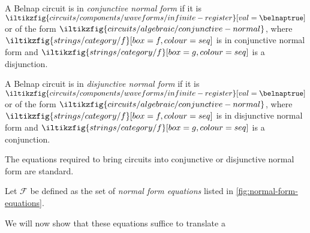 \begin{definition}
    A Belnap circuit is in \emph{conjunctive normal form} if it is \(
    \iltikzfig{circuits/components/waveforms/infinite-register}[val=\belnaptrue]
    \) or of the form \(
    \iltikzfig{circuits/algebraic/conjunctive-normal}
    \), where \(
    \iltikzfig{strings/category/f}[box=f, colour=seq]
    \) is in conjunctive normal form and \(
    \iltikzfig{strings/category/f}[box=g, colour=seq]
    \) is a disjunction.
\end{definition}

\begin{definition}
    A Belnap circuit is in \emph{disjunctive normal form} if it is \(
    \iltikzfig{circuits/components/waveforms/infinite-register}[val=\belnaptrue]
    \) or of the form \(
    \iltikzfig{circuits/algebraic/conjunctive-normal}
    \), where \(
    \iltikzfig{strings/category/f}[box=f, colour=seq]
    \) is in disjunctive normal form and \(
    \iltikzfig{strings/category/f}[box=g, colour=seq]
    \) is a conjunction.
\end{definition}

The equations required to bring circuits into conjunctive or disjunctive normal
form are standard.

\begin{definition}
    Let \(\mathcal{F}\) be defined as the set of \emph{normal form equations}
    listed in \cref{fig:normal-form-equations}.
\end{definition}



We will now show that these equations suffice to translate a

